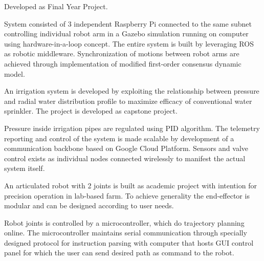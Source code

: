 \documentclass[letterpaper]{deedy-resume} %
\begin{document}
\begin{minipage}[t]{0.66\textwidth}
\vspace{\topsep}
\begin{tightitemize}
\item Developed as Final Year Project.
\item System consisted of 3 independent Raspberry Pi connected to the same subnet controlling individual robot arm in a Gazebo simulation running on computer using hardware-in-a-loop concept.
The entire system is built by leveraging ROS as robotic middleware.
Synchronization of motions between robot arms are achieved through implementation of modified first-order consensus dynamic model.
\end{tightitemize}
\sectionspace %

\vspace{\topsep}
\begin{tightitemize}
\item An irrigation system is developed by exploiting the relationship between pressure and radial water distribution profile to maximize efficacy of conventional water sprinkler.
The project is developed as capstone project.
\item Pressure inside irrigation pipes are regulated using PID algorithm.
The telemetry reporting and control of the system is made scalable by development of a communication backbone based on Google Cloud Platform.
Sensors and valve control exists as individual nodes connected wirelessly to manifest the actual system itself.
\end{tightitemize}
\sectionspace %

\vspace{\topsep}
\begin{tightitemize}
\item An articulated robot with 2 joints is built as academic project with intention for precision operation in lab-based farm. To achieve generality the end-effector is modular and can be designed according to user needs.
\item Robot joints is controlled by a microcontroller, which do trajectory planning online.
The microcontroller maintains serial communication through specially designed protocol for instruction parsing with computer that hosts GUI control panel for which the user can send desired path as command to the robot.
\end{tightitemize}
\sectionspace %

\end{minipage} %
\end{document}

